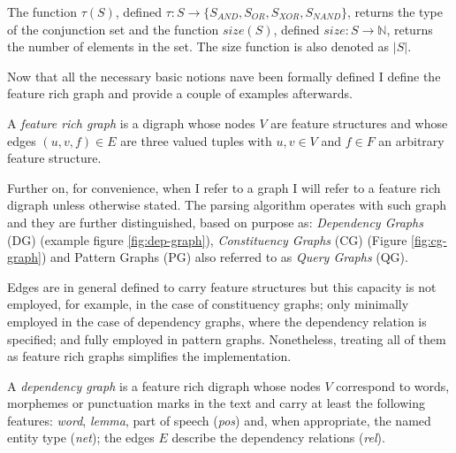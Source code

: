     The function $\tau(S)$, defined $\tau:S \rightarrow \{S_{AND},S_{OR},S_{XOR},S_{NAND} \}$, returns the type of the conjunction set and the function $size(S)$, defined $size:S \rightarrow \mathbb{N}$, returns the number of elements in the set. The size function is also denoted as $|S|$.
 
    Now that all the necessary basic notions nave been formally defined I define the feature rich graph and provide a couple of examples afterwards. 
 
    \begin{definition}\label{def:feature-rich-graph}
    	A \textit{feature rich graph} is a digraph whose nodes $V$ are feature structures and whose edges $(u,v,f) \in E$ are three valued tuples with $ u,v \in V$ and $f \in F$ an arbitrary feature structure.
    \end{definition}

    Further on, for convenience, when I refer to a graph I will refer to a feature rich digraph unless otherwise stated. The parsing algorithm operates with such graph and they are further distinguished, based on purpose as: \textit{Dependency Graphs} (DG) (example figure \ref{fig:dep-graph}), \textit{Constituency Graphs} (CG) (Figure \ref{fig:cg-graph}) and Pattern Graphs (PG) also referred to as \textit{Query Graphs} (QG).
    
    Edges are in general defined to carry feature structures but this capacity is not employed, for example, in the case of constituency graphs; only minimally employed in the case of dependency graphs, where the dependency relation is specified; and fully employed in pattern graphs. Nonetheless, treating all of them as feature rich graphs simplifies the implementation.

    \begin{definition}\label{def:dep-graph}
    	A \textit{dependency graph} is a feature rich digraph whose nodes $V$ correspond to words, morphemes or punctuation marks in the text and carry at least the following features: \textit{word}, \textit{lemma}, part of speech (\textit{pos}) and, when appropriate, the named entity type (\textit{net}); the edges $E$ describe the dependency relations (\textit{rel}).
    \end{definition}

